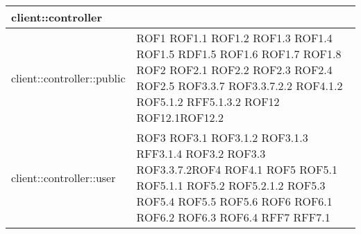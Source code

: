 \begin{center}
\begin{longtable}{| p{9cm} | p{4cm} |}
\hline
client::controller  &  \\
\hline
client::controller::public  &  ROF1 \newline ROF1.1 \newline ROF1.2 \newline ROF1.3 \newline ROF1.4 \newline ROF1.5 \newline RDF1.5 \newline ROF1.6 \newline ROF1.7 \newline ROF1.8 \newline ROF2 \newline ROF2.1 \newline ROF2.2 \newline ROF2.3 \newline ROF2.4 \newline ROF2.5  \newline ROF3.3.7 \newline ROF3.3.7.2.2 \newline ROF4.1.2 \newline ROF5.1.2 \newline RFF5.1.3.2 \newline ROF12 \newline ROF12.1\newline ROF12.2  \newline \\
\hline
client::controller::user  &  ROF3 \newline ROF3.1 \newline ROF3.1.2 \newline ROF3.1.3 \newline RFF3.1.4 \newline ROF3.2 \newline ROF3.3 \newline ROF3.3.7.2\newline ROF4 \newline ROF4.1 \newline ROF5 \newline ROF5.1 \newline ROF5.1.1 \newline ROF5.2 \newline ROF5.2.1.2 \newline ROF5.3 \newline ROF5.4 \newline ROF5.5  \newline ROF5.6 \newline ROF6 \newline ROF6.1 \newline ROF6.2 \newline ROF6.3 \newline ROF6.4 \newline RFF7 \newline RFF7.1 \newline \\

\end{longtable}
\end{center}
